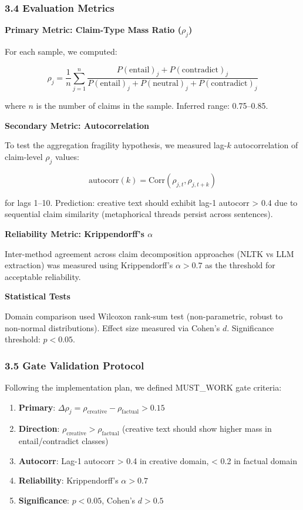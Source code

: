 \subsubsection{3.4 Evaluation Metrics}

\textbf{Primary Metric: Claim-Type Mass Ratio ($\rho_j$)}

For each sample, we computed:

$$\rho_j = \frac{1}{n} \sum_{j=1}^{n} \frac{P(\text{entail})_j + P(\text{contradict})_j}{P(\text{entail})_j + P(\text{neutral})_j + P(\text{contradict})_j}$$

where $n$ is the number of claims in the sample. Inferred range: 0.75--0.85.

\textbf{Secondary Metric: Autocorrelation}

To test the aggregation fragility hypothesis, we measured lag-$k$ autocorrelation of claim-level $\rho_j$ values:

$$\text{autocorr}(k) = \text{Corr}(\rho_{j,t}, \rho_{j,t+k})$$

for lags 1--10. Prediction: creative text should exhibit lag-1 autocorr > 0.4 due to sequential claim similarity (metaphorical threads persist across sentences).

\textbf{Reliability Metric: Krippendorff's $\alpha$}

Inter-method agreement across claim decomposition approaches (NLTK vs LLM extraction) was measured using Krippendorff's $\alpha > 0.7$ as the threshold for acceptable reliability.

\textbf{Statistical Tests}

Domain comparison used Wilcoxon rank-sum test (non-parametric, robust to non-normal distributions). Effect size measured via Cohen's $d$. Significance threshold: $p < 0.05$.

\subsubsection{3.5 Gate Validation Protocol}

Following the implementation plan, we defined MUST\_WORK gate criteria:

\begin{enumerate}
\item \textbf{Primary}: $\Delta\rho_j = \rho_{\text{creative}} - \rho_{\text{factual}} > 0.15$
\item \textbf{Direction}: $\rho_{\text{creative}} > \rho_{\text{factual}}$ (creative text should show higher mass in entail/contradict classes)
\item \textbf{Autocorr}: Lag-1 autocorr > 0.4 in creative domain, < 0.2 in factual domain
\item \textbf{Reliability}: Krippendorff's $\alpha > 0.7$
\item \textbf{Significance}: $p < 0.05$, Cohen's $d > 0.5$
\end{enumerate}

